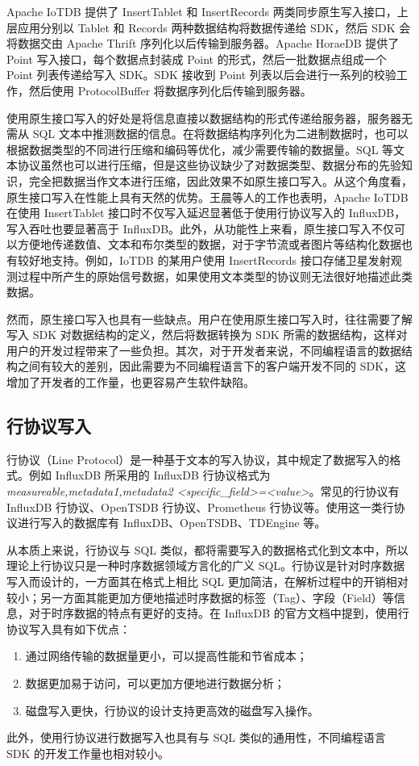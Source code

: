 Apache IoTDB 提供了 InsertTablet 和 InsertRecords 两类同步原生写入接口，上层应用分别以 Tablet 和 Records 两种数据结构将数据传递给 SDK，然后 SDK 会将数据交由 Apache Thrift\cite{apache2024thrift} 序列化以后传输到服务器。Apache HoraeDB 提供了 Point 写入接口，每个数据点封装成 Point 的形式，然后一批数据点组成一个 Point 列表传递给写入 SDK。SDK 接收到 Point 列表以后会进行一系列的校验工作，然后使用 ProtocolBuffer\cite{currier2022protocol} 将数据序列化后传输到服务器。

使用原生接口写入的好处是将信息直接以数据结构的形式传递给服务器，服务器无需从 SQL 文本中推测数据的信息。在将数据结构序列化为二进制数据时，也可以根据数据类型的不同进行压缩和编码等优化，减少需要传输的数据量。SQL 等文本协议虽然也可以进行压缩，但是这些协议缺少了对数据类型、数据分布的先验知识，完全把数据当作文本进行压缩，因此效果不如原生接口写入。从这个角度看，原生接口写入在性能上具有天然的优势。王晨等人的工作也表明，Apache IoTDB 在使用 InsertTablet 接口时不仅写入延迟显著低于使用行协议写入的 InfluxDB，写入吞吐也要显著高于 InfluxDB\cite{wang2023apache}。此外，从功能性上来看，原生接口写入不仅可以方便地传递数值、文本和布尔类型的数据，对于字节流或者图片等结构化数据也有较好地支持。例如，IoTDB 的某用户使用 InsertRecords 接口存储卫星发射观测过程中所产生的原始信号数据，如果使用文本类型的协议则无法很好地描述此类数据。

然而，原生接口写入也具有一些缺点。用户在使用原生接口写入时，往往需要了解写入 SDK 对数据结构的定义，然后将数据转换为 SDK 所需的数据结构，这样对用户的开发过程带来了一些负担。其次，对于开发者来说，不同编程语言的数据结构之间有较大的差别，因此需要为不同编程语言下的客户端开发不同的 SDK，这增加了开发者的工作量，也更容易产生软件缺陷。

\subsection{行协议写入}
行协议（Line Protocol）\cite{influx2024lineprotocol}是一种基于文本的写入协议，其中规定了数据写入的格式。例如 InfluxDB 所采用的 InfluxDB 行协议格式为\emph{measureable,metadata1,metadata2 <specific\_field>=<value>}。常见的行协议有 InfluxDB 行协议、OpenTSDB 行协议、Prometheus 行协议等。使用这一类行协议进行写入的数据库有 InfluxDB、OpenTSDB、TDEngine 等。

从本质上来说，行协议与 SQL 类似，都将需要写入的数据格式化到文本中，所以理论上行协议只是一种时序数据领域方言化的广义 SQL。行协议是针对时序数据写入而设计的，一方面其在格式上相比 SQL 更加简洁，在解析过程中的开销相对较小；另一方面其能更加方便地描述时序数据的标签（Tag）、字段（Field）等信息，对于时序数据的特点有更好的支持。在 InfluxDB 的官方文档中提到，使用行协议写入具有如下优点：
\begin{enumerate}
  \item 通过网络传输的数据量更小，可以提高性能和节省成本；
  \item 数据更加易于访问，可以更加方便地进行数据分析；
  \item 磁盘写入更快，行协议的设计支持更高效的磁盘写入操作。
\end{enumerate}
此外，使用行协议进行数据写入也具有与 SQL 类似的通用性，不同编程语言 SDK 的开发工作量也相对较小。

